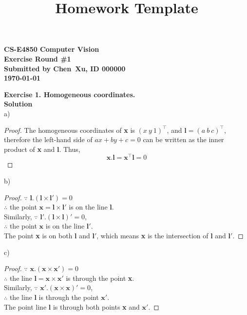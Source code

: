 \documentclass[letterpaper, 11pt]{article}
\begin{document}
\title{Homework Template}

\begin{center}
    {
        \large
        \bf
        CS-E4850 Computer Vision\\
        Exercise Round \#1\\
        Submitted by Chen\ Xu, ID 000000\\
        \today
    }
\end{center}

\bigskip

\textbf{Exercise 1. Homogeneous coordinates.}\\

\textbf{Solution}\\

a)
\begin{proof}
    The homogeneous coordinates of \textbf{x} is $(x\ y\ 1)^\top$, and $\textbf{l} = (a\ b\ c)^\top$,\\
    therefore the left-hand side of $ax+by+c=0$ can be written as the inner product of \textbf{x} and \textbf{l}. Thus,
    $$\textbf{x}.\textbf{l}=\textbf{x}^\top\textbf{l}=0$$
\end{proof}

b)
\begin{proof}
    $\because$ $\textbf{l}.(\textbf{l}\times\textbf{l}')=0$\\
    $\therefore$ the point $\textbf{x}=\textbf{l}\times\textbf{l}'$ is on the line \textbf{l}.\\
    Similarly, $\because$ $\textbf{l}'.(\textbf{l}\times\textbf{l})'=0$, \\
    $\therefore$ the point $\textbf{x}$ is on the line $\textbf{l}'$.\\
    The point \textbf{x} is on both \textbf{l} and $\textbf{l}'$, which means \textbf{x} is the intersection of \textbf{l} and $\textbf{l}'$.
\end{proof}

c)
\begin{proof}
    $\because$ $\textbf{x}.(\textbf{x}\times\textbf{x}')=0$\\
    $\therefore$ the line $\textbf{l}=\textbf{x}\times\textbf{x}'$ is through the point \textbf{x}.\\
    Similarly, $\because$ $\textbf{x}'.(\textbf{x}\times\textbf{x})'=0$, \\
    $\therefore$ the line $\textbf{l}$ is through the point $\textbf{x}'$.\\
    The point line \textbf{l} is through both points \textbf{x} and $\textbf{x}'$.
\end{proof}
\end{document}
